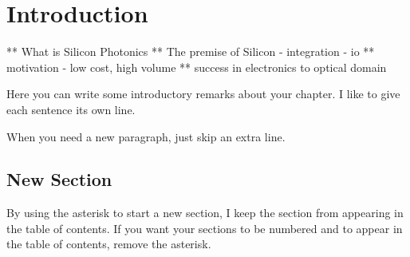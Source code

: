
\chapter*{Introduction} %


** What is Silicon Photonics
** The premise of Silicon - integration - io
** motivation - low cost, high volume 
** success in electronics to optical domain


Here you can write some introductory remarks about your chapter.
I like to give each sentence its own line.

When you need a new paragraph, just skip an extra line.

\section*{New Section}

By using the asterisk to start a new section, I keep the section from appearing in the table of contents.
If you want your sections to be numbered and to appear in the table of contents, remove the asterisk.

